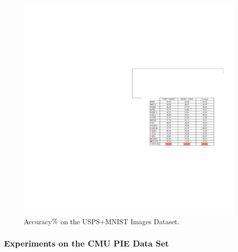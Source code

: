 \documentclass[journal,twocolumn]{IEEEtran}
\begin{document}
\begin{CJK*}{UTF8}{gkai}
	\begin{figure}[h!]
		\centering
		\includegraphics[width=0.8\linewidth]{USPS.pdf}
		\caption { Accuracy${\rm{\% }}$ on the USPS+MNIST Images Dataset.} 
		\label{fig:accUSPS}
	\end{figure} 	


	





\subsubsection{\textbf{Experiments on the CMU PIE Data Set}}
\label{subsubsection:Experiments on the CMU PIE dataset}


\end{CJK*}
\end{document}
